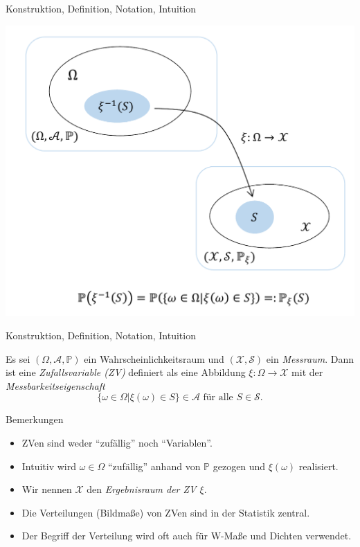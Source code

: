 \documentclass[
  8pt,
  ignorenonframetext,
]{beamer}
\begin{document}
\begin{frame}{Konstruktion, Definition, Notation, Intuition}
\protect\hypertarget{konstruktion-definition-notation-intuition-1}{}
\vspace{.2cm}
\center

\begin{center}\includegraphics[width=0.7\linewidth]{4_Abbildungen/wtfi_4_zufallsvariable} \end{center}
\end{frame}

\begin{frame}{Konstruktion, Definition, Notation, Intuition}
\protect\hypertarget{konstruktion-definition-notation-intuition-2}{}
\small
\begin{definition}[Zufallsvariable]
\justifying
Es sei $(\Omega, \mathcal{A}, \mathbb{P})$ ein Wahrscheinlichkeitsraum und
$(\mathcal{X},\mathcal{S})$ ein \textit{Messraum}. Dann ist eine \textit{Zufallsvariable (ZV)}
definiert als eine Abbildung $\xi:\Omega \to \mathcal{X}$ mit der \textit{Messbarkeitseigenschaft}
\begin{equation}
\{\omega \in \Omega|\xi(\omega) \in S \} \in \mathcal{A} \mbox{ für alle } S \in \mathcal{S}.
\end{equation}
\end{definition}

Bemerkungen

\begin{itemize}
\justifying
\item ZVen sind weder ``zufällig'' noch ``Variablen''.
\item Intuitiv wird $\omega \in \Omega$ ``zufällig'' anhand von $\mathbb{P}$
gezogen und $\xi(\omega)$ realisiert.
\item Wir nennen $\mathcal{X}$ den \textit{Ergebnisraum der ZV $\xi$}.
\item Die Verteilungen (Bildmaße) von ZVen sind in der Statistik zentral.
\item Der Begriff der Verteilung wird oft auch für W-Maße und Dichten verwendet.
\end{itemize}
\end{frame}
\end{document}
